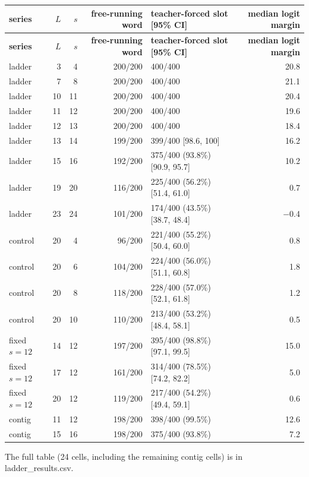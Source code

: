 \documentclass[paper=a4,fontsize=11pt,DIV=11,parskip=half,headings=small,numbers=noendperiod]{scrartcl}
\DeclareRobustCommand{\code}[1]{{\fontseries{m}\ttfamily #1}}
\DeclareRobustCommand{\hdr}[1]{\textsf{\bfseries #1}}
\begin{document}
{\small\nopagebreak[4]
\begin{longtable}{@{}l r r r l r@{}}
\toprule
\hdr{series} & \hdr{$L$} & \hdr{$s$} & \hdr{free-running word} & \hdr{teacher-forced slot [95\% CI]} & \hdr{median logit margin} \\
\midrule
\endfirsthead
\toprule
\hdr{series} & \hdr{$L$} & \hdr{$s$} & \hdr{free-running word} & \hdr{teacher-forced slot [95\% CI]} & \hdr{median logit margin} \\
\midrule
\endhead
\bottomrule
\endlastfoot
ladder & 3 & 4 & 200/200 & 400/400 & 20.8 \\
ladder & 7 & 8 & 200/200 & 400/400 & 21.1 \\
ladder & 10 & 11 & 200/200 & 400/400 & 20.4 \\
ladder & 11 & 12 & 200/200 & 400/400 & 19.6 \\
ladder & 12 & 13 & 200/200 & 400/400 & 18.4 \\
ladder & 13 & 14 & 199/200 & 399/400 [98.6, 100] & 16.2 \\
ladder & 15 & 16 & 192/200 & 375/400 (93.8\%) [90.9, 95.7] & 10.2 \\
ladder & 19 & 20 & 116/200 & 225/400 (56.2\%) [51.4, 61.0] & 0.7 \\
ladder & 23 & 24 & 101/200 & 174/400 (43.5\%) [38.7, 48.4] & \ensuremath{-}0.4 \\
control & 20 & 4 & 96/200 & 221/400 (55.2\%) [50.4, 60.0] & 0.8 \\
control & 20 & 6 & 104/200 & 224/400 (56.0\%) [51.1, 60.8] & 1.8 \\
control & 20 & 8 & 118/200 & 228/400 (57.0\%) [52.1, 61.8] & 1.2 \\
control & 20 & 10 & 110/200 & 213/400 (53.2\%) [48.4, 58.1] & 0.5 \\
fixed $s=12$ & 14 & 12 & 197/200 & 395/400 (98.8\%) [97.1, 99.5] & 15.0 \\
fixed $s=12$ & 17 & 12 & 161/200 & 314/400 (78.5\%) [74.2, 82.2] & 5.0 \\
fixed $s=12$ & 20 & 12 & 119/200 & 217/400 (54.2\%) [49.4, 59.1] & 0.6 \\
contig & 11 & 12 & 198/200 & 398/400 (99.5\%) & 12.6 \\
contig & 15 & 16 & 198/200 & 375/400 (93.8\%) & 7.2 \\
\end{longtable}}

The full table (24 cells, including the remaining contig cells) is in
\code{ladder\_\allowbreak{}results.\allowbreak{}csv}.
\end{document}
